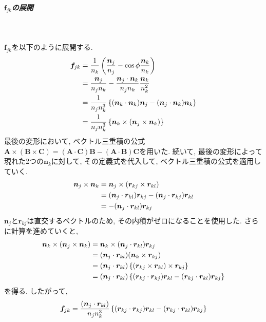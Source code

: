 \subparagraph{$\bm{f}_{jk}$の展開} \

$\bm{f}_{jk}$を以下のように展開する. 
\begin{align}
    \bm{f}_{jk}
 &=
    \frac{1}{n_k}
    \left(
           \frac{\bm{n}_{j}}{n_{j}} - \cos\phi \frac{\bm{n}_{k}}{n_{k}}
    \right)
 \notag
 \\
 &=
    \frac{\bm{n}_{j}}{n_{j}n_{k}}
   -\frac{\bm{n}_{j} \cdot \bm{n}_{k}}{n_{j}n_{k}}
    \frac{\bm{n}_{k}}{n_{k}^{2}}
 \notag
 \\
 &=
    \frac{1}{n_{j}n_{k}^{3}}
    \left\{
            (\bm{n}_{k} \cdot \bm{n}_{k}) \bm{n}_{j}
           -(\bm{n}_{j} \cdot \bm{n}_{k}) \bm{n}_{k}
    \right\}
 \notag
 \\
 &=
    \frac{1}{n_{j}n_{k}^{3}}
    \left\{
            \bm{n}_{k} \times (\bm{n}_{j} \times \bm{n}_{k})
    \right\}
 \notag
\end{align}
最後の変形において, ベクトル三重積の公式
$\bm{A} \times (\bm{B} \times \bm{C}) = (\bm{A} \cdot \bm{C})\bm{B}
 - (\bm{A} \cdot \bm{B})\bm{C}$を用いた.
続いて, 最後の変形によって現れた2つの$\bm{n}_{k}$に対して, 
その定義式を代入して, ベクトル三重積の公式を適用していく. 
\begin{align}
    \bm{n}_{j} \times \bm{n}_{k}
 &=
    \bm{n}_{j} \times (\bm{r}_{kj} \times \bm{r}_{kl})
 \notag
 \\
 &=
    (\bm{n}_{j} \cdot \bm{r}_{kl}) \bm{r}_{kj}
   -(\bm{n}_{j} \cdot \bm{r}_{kj}) \bm{r}_{kl}
 \notag
 \\
 &=
   -(\bm{n}_{j} \cdot \bm{r}_{kl}) \bm{r}_{kj}
 \notag
\end{align}
$\bm{n}_{j}$と$\bm{r}_{kj}$は直交するベクトルのため, その内積がゼロになることを使用した. 
さらに計算を進めていくと, 
\begin{align}
    \bm{n}_{k} \times (\bm{n}_{j} \times \bm{n}_{k})
 &=
    \bm{n}_{k} \times (\bm{n}_{j} \cdot \bm{r}_{kl}) \bm{r}_{kj}
 \notag
 \\
 &=
    (\bm{n}_{j} \cdot \bm{r}_{kl})
    (\bm{n}_{k} \times \bm{r}_{kj})
 \notag
 \\
 &=
   (\bm{n}_{j} \cdot \bm{r}_{kl})
   \left\{
          (\bm{r}_{kj} \times \bm{r}_{kl}) \times \bm{r}_{kj}
   \right\}
 \notag
 \\
 &=
   (\bm{n}_{j} \cdot \bm{r}_{kl})
   \left\{
           (\bm{r}_{kj} \cdot \bm{r}_{kj}) \bm{r}_{kl}
          -(\bm{r}_{kj} \cdot \bm{r}_{kl}) \bm{r}_{kj}
   \right\}
 \notag
\end{align}
を得る. 
したがって, 
\begin{align}
  \bm{f}_{jk}
 =
  \frac{(\bm{n}_{j} \cdot \bm{r}_{kl})}{n_{j}n_{k}^{3}}
  \left\{
          (\bm{r}_{kj} \cdot \bm{r}_{kj}) \bm{r}_{kl}
         -(\bm{r}_{kj} \cdot \bm{r}_{kl}) \bm{r}_{kj}
  \right\}
 \notag
\end{align}
